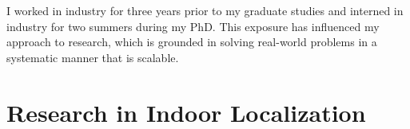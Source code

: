 \documentclass[10pt]{article}
\begin{document}
I worked in industry for three years prior to my graduate studies and interned in industry for two summers during my PhD. This exposure has influenced my approach to research, which is grounded in solving real-world problems in a systematic manner that is scalable.  









\section{Research in Indoor Localization}
\end{document}
